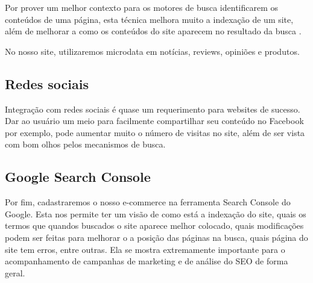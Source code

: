Por prover um melhor contexto para os motores de busca identificarem os conteúdos de uma página, esta técnica melhora muito a indexação de um site, além de melhorar a como os conteúdos do site aparecem no resultado da busca \cite{Microdata}.

No nosso site, utilizaremos microdata em notícias, reviews, opiniões e produtos.

\subsection{Redes sociais}
Integração com redes sociais é quase um requerimento para websites de sucesso. Dar ao usuário um meio para facilmente compartilhar seu conteúdo no Facebook por exemplo, pode aumentar muito o número de visitas no site, além de ser vista com bom olhos pelos mecanismos de busca.

\subsection{Google Search Console}
Por fim, cadastraremos o nosso e-commerce na ferramenta Search Console do Google. Esta nos permite ter um visão de como está a indexação do site, quais os termos que quandos buscados o site aparece melhor colocado, quais modificações podem ser feitas para melhorar o a posição das páginas na busca, quais página do site tem erros, entre outras. Ela se mostra extremamente importante para o acompanhamento de campanhas de marketing e de análise do SEO de forma geral.


